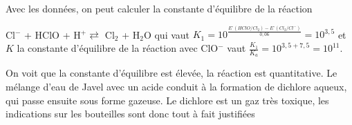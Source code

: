 \begin{solution}
\begin{questions}
Avec les données, on peut calculer la constante d'équilibre de la réaction 

Cl$^-$ + HClO + H$^+ \rightleftarrows$ Cl$_2$ + H$_2$O qui vaut $K_1 = 10^{\frac{E^\circ(HClO/Cl_2)-E^\circ(Cl_2/Cl^-)}{0,06}} = 10^{3,5}$ et $K$ la constante d'équilibre de la réaction avec ClO$^-$ vaut $\frac{K_1}{K_a} = 10^{3,5+7,5} = 10^{11}$.


\question On voit que la constante d'équilibre est élevée, la réaction est quantitative. Le mélange d'eau de Javel avec un acide conduit à la formation de dichlore aqueux, qui passe ensuite sous forme gazeuse. Le dichlore est un gaz très toxique, les indications sur les bouteilles sont donc tout à fait justifiées

\end{questions}
\end{solution}